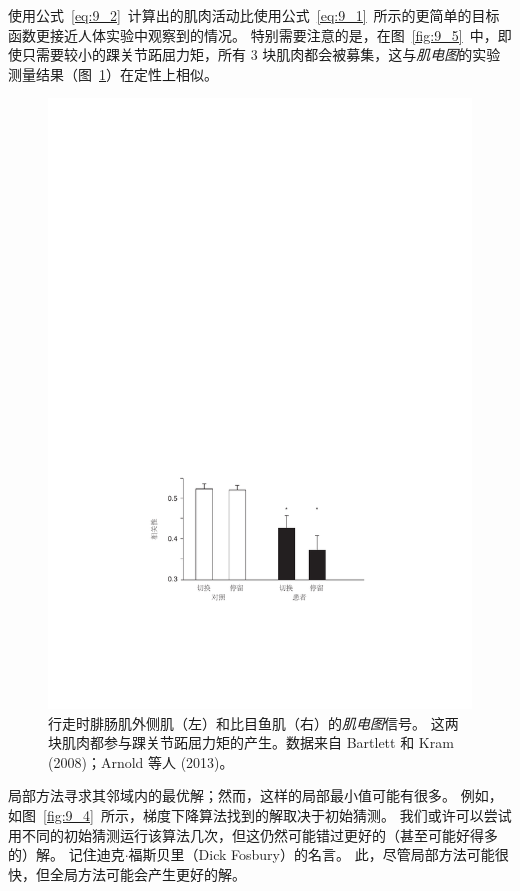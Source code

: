 使用公式~\ref{eq:9_2}~计算出的肌肉活动比使用公式~\ref{eq:9_1}~所示的更简单的目标函数更接近人体实验中观察到的情况。
特别需要注意的是，在图~\ref{fig:9_5}~中，即使只需要较小的踝关节跖屈力矩，所有 3 块肌肉都会被募集，这与\textit{肌电图}的实验测量结果（图~\ref{fig:9_6}）在定性上相似。


\begin{figure}[!htb]
	\centering
	\includegraphics[width=1.0\linewidth]{chap9/9_6}
	\caption{行走时腓肠肌外侧肌（左）和比目鱼肌（右）的\textit{肌电图}信号。
		这两块肌肉都参与踝关节跖屈力矩的产生。数据来自 Bartlett 和 Kram (2008)；Arnold 等人 (2013)。 \label{fig:9_6}}
\end{figure}


局部方法寻求其邻域内的最优解；然而，这样的局部最小值可能有很多。
例如，如图~\ref{fig:9_4}~所示，梯度下降算法找到的解取决于初始猜测。
我们或许可以尝试用不同的初始猜测运行该算法几次，但这仍然可能错过更好的（甚至可能好得多的）解。
记住迪克$\cdot$福斯贝里（Dick Fosbury）的名言。
此，尽管局部方法可能很快，但全局方法可能会产生更好的解。



